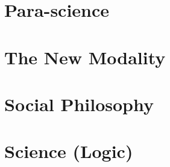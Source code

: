 \documentclass[10pt,twoside,draft]{memoir}
\begin{document}
\part{Para-science}





\part{The New Modality}



% 





\part{Social Philosophy}




\part{Science (Logic)}


\end{document}
